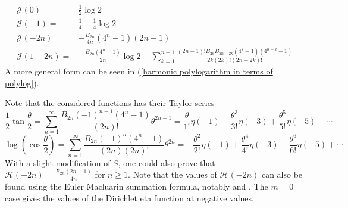 \documentclass{article}
\begin{document}
\begin{align}\label{Negative integers of J}
    \mathcal{J}(0)=& \frac{1}{2}\log 2 \\
    \mathcal{J}(-1)= &\frac{1}{4}-\frac{1}{4}\log 2 \\
    \mathcal{J}(-2n)= &-\frac{B_{2n}}{4n}(4^n-1)(2n-1) \\
    \mathcal{J}(1-2n)= &-\frac{B_{2n}(4^n-1)}{2n}\log 2-\sum_{k=1}^{n-1}\frac{(2n-1)!B_{2k}B_{2n-2k}(4^k-1)(4^{n-k}-1)}{2k(2k)!(2n-2k)!}
\end{align}
A more general form can be seen in (\ref{harmonic polylogarithm in terms of polylog}).
\par
Note that the considered functions has their Taylor series $$\frac{1}{2}\tan\frac{\theta}{2}=\sum_{n=1}^{\infty}\frac{B_{2n}(-1)^{n+1}(4^n-1)}{(2n)!}\theta^{2n-1}=\frac{\theta}{1!}\eta(-1)-\frac{\theta^3}{3!}\eta(-3)+\frac{\theta^5}{5!}\eta(-5)-\cdots$$
$$\log\left(\cos \frac{\theta}{2}\right)=\sum_{n=1}^{\infty}\frac{B_{2n}(-1)^{n}(4^n-1)}{(2n)(2n)!}\theta^{2n}=-\frac{\theta^2}{2!}\eta(-1)+\frac{\theta^4}{4!}\eta(-3)-\frac{\theta^6}{6!}\eta(-5)+\cdots$$
With a slight modification of $S$, one could also prove that $\mathcal{H}(-2n)=\frac{B_{2n} (2n-1)}{4n}$ for $n\geq 1$. Note that the values of $\mathcal{H}(-2n)$ can also be found using the Euler Macluarin summation formula, notably \cite{matsuoka1982values} and \cite{apostol1984dirichlet}. The $m=0$ case gives the values of the Dirichlet eta function at negative values.
\end{document}

